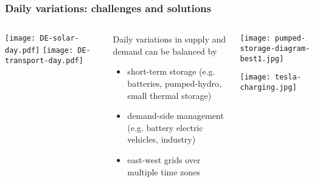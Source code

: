 \documentclass[10pt,aspectratio=169,dvipsnames]{beamer}
\let\olditem\item
\renewcommand{\item}{%
\olditem\vspace{5pt}}
\begin{document}
\begin{frame}
  \frametitle{Daily variations: challenges and solutions}

  \begin{columns}[T]
    \begin{column}{5cm}
      \texttt{[image: DE-solar-day.pdf]}
      \texttt{[image: DE-transport-day.pdf]}
    \end{column}
    \begin{column}{4cm}
      Daily variations in supply and demand can be balanced by
      \begin{itemize}
      \item \alert{short-term storage} (e.g. batteries, pumped-hydro, small thermal storage)
      \item \alert{demand-side management} (e.g. battery electric vehicles,
        industry)
      \item \alert{east-west grids over multiple time zones}
      \end{itemize}

    \end{column}
    \begin{column}{5cm}
      \texttt{[image: pumped-storage-diagram-best1.jpg]}

      \vspace{.5cm}

      \texttt{[image: tesla-charging.jpg]}
    \end{column}
  \end{columns}

\end{frame}
\end{document}
